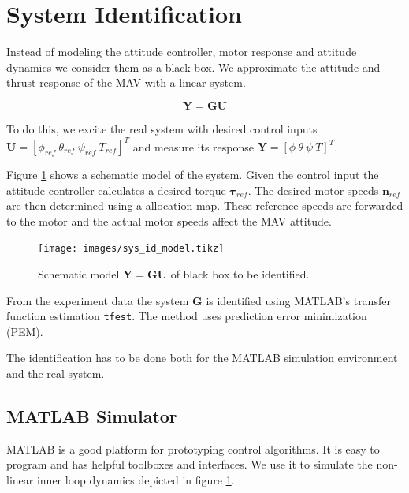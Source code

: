 
\section{System Identification}
\label{sec:sys_id}
Instead of modeling the attitude controller, motor response and attitude dynamics we consider them as a black box. We approximate the attitude and thrust response of the MAV with a linear system.

\begin{equation}
\mathbf{Y} = \mathbf{G} \mathbf{U}
\end{equation}

To do this, we excite the real system with desired control inputs $\mathbf{U} = \left[\phi_{ref} ~ \theta_{ref} ~ \psi_{ref} ~ T_{ref} \right]^T$ and measure its response $\mathbf{Y} = \left[\phi ~ \theta ~ \psi ~ T \right]^T$. 

Figure \ref{pics:sys_id_model} shows a schematic model of the system. Given the control input the attitude controller calculates a desired torque $\boldsymbol{\tau}_{ref}$. The desired motor speeds $\mathbf{n}_{ref}$ are then determined using a allocation map. These reference speeds are forwarded to the motor and the actual motor speeds affect the MAV attitude.

\begin{figure}
\centering
\texttt{[image: images/sys\_id\_model.tikz]}
\caption{Schematic model $\mathbf{Y} = \mathbf{G} \mathbf{U}$ of black box to be identified.}
\label{pics:sys_id_model}
\end{figure}

From the experiment data the system $\mathbf{G}$ is identified using MATLAB's transfer function estimation \texttt{tfest}. The method uses prediction error minimization (PEM).

The identification has to be done both for the MATLAB simulation environment and the real system.

\subsection{MATLAB Simulator}
\label{sec:matlab_simulator}
MATLAB is a good platform for prototyping control algorithms. It is easy to program and has helpful toolboxes and interfaces. We use it to simulate the non-linear inner loop dynamics depicted in figure \ref{pics:sys_id_model}.


